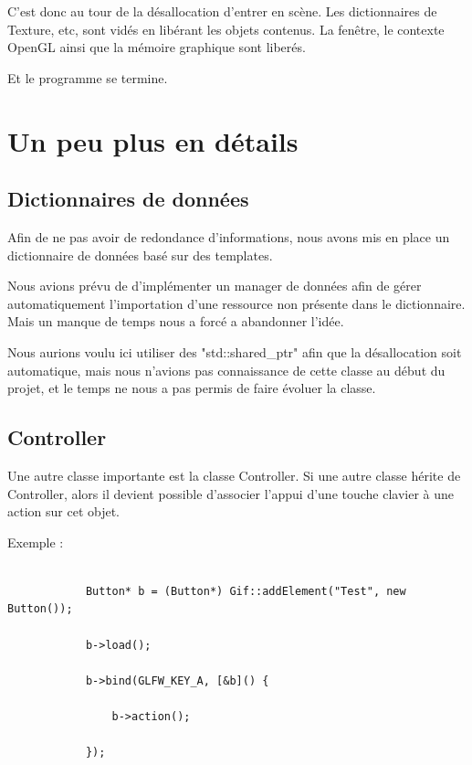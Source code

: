 \documentclass[a4paper]{report}
\begin{document}
    \vspace{5mm}

    C'est donc au tour de la désallocation d'entrer en scène.
    Les dictionnaires de Texture, etc, sont vidés en libérant les objets contenus.
    La fenêtre, le contexte OpenGL ainsi que la mémoire graphique sont liberés.

    \vspace{5mm}

    Et le programme se termine.

\chapter{Un peu plus en détails}

    \section{Dictionnaires de données}

        Afin de ne pas avoir de redondance d'informations, nous avons mis en place un dictionnaire de données basé sur
        des templates.

        Nous avions prévu de d'implémenter un manager de données afin de gérer automatiquement l'importation d'une
        ressource non présente dans le dictionnaire. Mais un manque de temps nous a forcé a abandonner l'idée.

        Nous aurions voulu ici utiliser des "std::shared\_ptr" afin que la désallocation soit automatique, mais nous n'avions
        pas connaissance de cette classe au début du projet, et le temps ne nous a pas permis de faire évoluer la
        classe.

    \section{Controller}

        Une autre classe importante est la classe Controller. Si une autre classe hérite de Controller, alors il devient
        possible d'associer l'appui d'une touche clavier à une action sur cet objet.

    \vspace{5mm}

        Exemple :


    \begin{lstlisting}

            Button* b = (Button*) Gif::addElement("Test", new Button());

            b->load();

            b->bind(GLFW_KEY_A, [&b]() {

                b->action();

            });
    \end{lstlisting}
\end{document}
